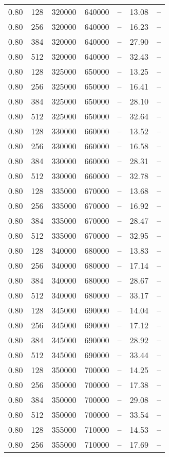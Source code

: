 \begin{tabular}{l|l|l|l|l|l|l}
0.80 & 128 & 320000 & 640000 & -- & 13.08 & --\\
0.80 & 256 & 320000 & 640000 & -- & 16.23 & --\\
0.80 & 384 & 320000 & 640000 & -- & 27.90 & --\\
0.80 & 512 & 320000 & 640000 & -- & 32.43 & --\\
0.80 & 128 & 325000 & 650000 & -- & 13.25 & --\\
0.80 & 256 & 325000 & 650000 & -- & 16.41 & --\\
0.80 & 384 & 325000 & 650000 & -- & 28.10 & --\\
0.80 & 512 & 325000 & 650000 & -- & 32.64 & --\\
0.80 & 128 & 330000 & 660000 & -- & 13.52 & --\\
0.80 & 256 & 330000 & 660000 & -- & 16.58 & --\\
0.80 & 384 & 330000 & 660000 & -- & 28.31 & --\\
0.80 & 512 & 330000 & 660000 & -- & 32.78 & --\\
0.80 & 128 & 335000 & 670000 & -- & 13.68 & --\\
0.80 & 256 & 335000 & 670000 & -- & 16.92 & --\\
0.80 & 384 & 335000 & 670000 & -- & 28.47 & --\\
0.80 & 512 & 335000 & 670000 & -- & 32.95 & --\\
0.80 & 128 & 340000 & 680000 & -- & 13.83 & --\\
0.80 & 256 & 340000 & 680000 & -- & 17.14 & --\\
0.80 & 384 & 340000 & 680000 & -- & 28.67 & --\\
0.80 & 512 & 340000 & 680000 & -- & 33.17 & --\\
0.80 & 128 & 345000 & 690000 & -- & 14.04 & --\\
0.80 & 256 & 345000 & 690000 & -- & 17.12 & --\\
0.80 & 384 & 345000 & 690000 & -- & 28.92 & --\\
0.80 & 512 & 345000 & 690000 & -- & 33.44 & --\\
0.80 & 128 & 350000 & 700000 & -- & 14.25 & --\\
0.80 & 256 & 350000 & 700000 & -- & 17.38 & --\\
0.80 & 384 & 350000 & 700000 & -- & 29.08 & --\\
0.80 & 512 & 350000 & 700000 & -- & 33.54 & --\\
0.80 & 128 & 355000 & 710000 & -- & 14.53 & --\\
0.80 & 256 & 355000 & 710000 & -- & 17.69 & --\\

\end{tabular}
